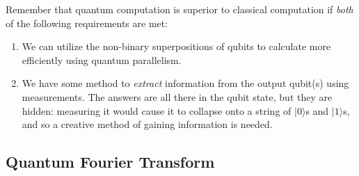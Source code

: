 \documentclass{article}
\begin{document}
    Remember that quantum computation is superior to classical computation if \textit{both} of the following requirements are met: 
    \begin{enumerate}
      \item We can utilize the non-binary superpositions of qubits to calculate more efficiently using quantum parallelism. 
      \item We have some method to \textit{extract} information from the output qubit(s) using measurements. The answers are all there in the qubit state, but they are hidden: measuring it would cause it to collapse onto a string of $|0\rangle$s and $|1\rangle$s, and so a creative method of gaining information is needed. 
    \end{enumerate}

  \subsection{Quantum Fourier Transform} 
\end{document}
